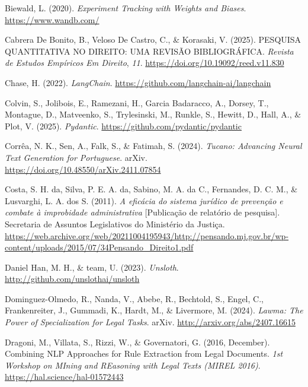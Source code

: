 \documentclass[
  12pt,
]{article}
\newlength{\cslhangindent}
\newenvironment{CSLReferences}[2] %
 {\begin{list}{}{%
  \setlength{\itemindent}{0pt}
  \setlength{\leftmargin}{0pt}
  \setlength{\parsep}{0pt}
  \ifodd #1
   \setlength{\leftmargin}{\cslhangindent}
   \setlength{\itemindent}{-1\cslhangindent}
  \fi
  \setlength{\itemsep}{#2\baselineskip}}}
 {\end{list}}
\begin{document}
\begin{CSLReferences}{1}{0}
Biewald, L. (2020). \emph{Experiment {Tracking} with {Weights} and
{Biases}}. \url{https://www.wandb.com/}

Cabrera De Bonito, B., Veloso De Castro, C., \& Korasaki, V. (2025).
{PESQUISA} {QUANTITATIVA} {NO} {DIREITO}: {UMA} {REVISÃO}
{BIBLIOGRÁFICA}. \emph{Revista de Estudos Empíricos Em Direito},
\emph{11}. \url{https://doi.org/10.19092/reed.v11.830}

Chase, H. (2022). \emph{{LangChain}}.
\url{https://github.com/langchain-ai/langchain}

Colvin, S., Jolibois, E., Ramezani, H., Garcia Badaracco, A., Dorsey,
T., Montague, D., Matveenko, S., Trylesinski, M., Runkle, S., Hewitt,
D., Hall, A., \& Plot, V. (2025). \emph{Pydantic}.
\url{https://github.com/pydantic/pydantic}

Corrêa, N. K., Sen, A., Falk, S., \& Fatimah, S. (2024). \emph{Tucano:
{Advancing} {Neural} {Text} {Generation} for {Portuguese}}. arXiv.
\url{https://doi.org/10.48550/arXiv.2411.07854}

Costa, S. H. da, Silva, P. E. A. da, Sabino, M. A. da C., Fernandes, D.
C. M., \& Lusvarghi, L. A. dos S. (2011). \emph{A eficácia do sistema
jurídico de prevenção e combate à improbidade administrativa}
{[}Publicação de relatório de pesquisa{]}. Secretaria de Assuntos
Legislativos do Ministério da Justiça.
\url{https://web.archive.org/web/20211004195943/http://pensando.mj.gov.br/wp-content/uploads/2015/07/34Pensando_Direito1.pdf}

Daniel Han, M. H., \& team, U. (2023). \emph{Unsloth}.
\url{http://github.com/unslothai/unsloth}

Dominguez-Olmedo, R., Nanda, V., Abebe, R., Bechtold, S., Engel, C.,
Frankenreiter, J., Gummadi, K., Hardt, M., \& Livermore, M. (2024).
\emph{Lawma: {The} {Power} of {Specialization} for {Legal} {Tasks}}.
arXiv. \url{http://arxiv.org/abs/2407.16615}

Dragoni, M., Villata, S., Rizzi, W., \& Governatori, G. (2016,
December). Combining {NLP} {Approaches} for {Rule} {Extraction} from
{Legal} {Documents}. \emph{1st {Workshop} on {MIning} and {REasoning}
with {Legal} Texts ({MIREL} 2016)}.
\url{https://hal.science/hal-01572443}


\end{CSLReferences}
\end{document}
